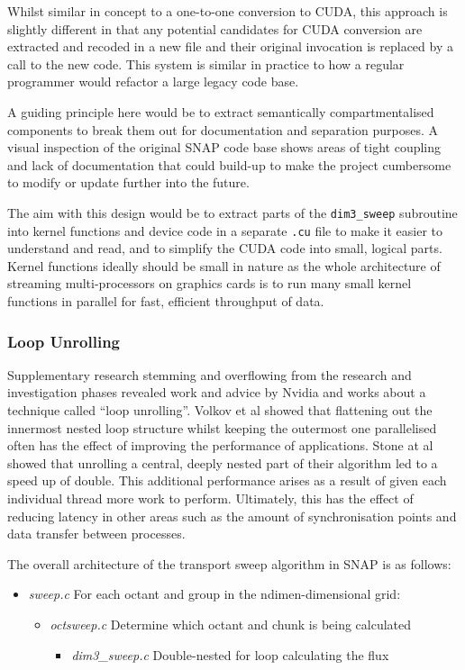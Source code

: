 \documentclass[conference]{IEEEtran}
\begin{document}
Whilst similar in concept to a one-to-one conversion to CUDA, this approach is slightly different in that any potential candidates for CUDA conversion are extracted and recoded in a new file and their original invocation is replaced by a call to the new code. This system is similar in practice to how a regular programmer would refactor a large legacy code base.

A guiding principle here would be to extract semantically compartmentalised components to break them out for documentation and separation purposes. A visual inspection of the original SNAP code base shows areas of tight coupling and lack of documentation that could build-up to make the project cumbersome to modify or update further into the future.

The aim with this design would be to extract parts of the \texttt{dim3\_sweep} subroutine into kernel functions and device code in a separate \texttt{.cu} file to make it easier to understand and read, and to simplify the CUDA code into small, logical parts. Kernel functions ideally should be small in nature as the whole architecture of streaming multi-processors on graphics cards is to run many small kernel functions in parallel for fast, efficient throughput of data.


\subsubsection{Loop Unrolling}

Supplementary research stemming and overflowing from the research and investigation phases revealed work and advice by Nvidia and works about a technique called ``loop unrolling''. Volkov et al\cite{volkov2011unrolling} showed that flattening out the innermost nested loop structure whilst keeping the outermost one parallelised often has the effect of improving the performance of applications. Stone at al\cite{stone2007accelerating} showed that unrolling a central, deeply nested part of their algorithm led to a speed up of double. This additional performance arises as a result of given each individual thread more work to perform. Ultimately, this has the effect of reducing latency in other areas such as the amount of synchronisation points and data transfer between processes.

The overall architecture of the transport sweep algorithm in SNAP is as follows:

\begin{itemize}
    \item \textit{sweep.c}
    For each octant and group in the ndimen-dimensional grid:
    \begin{itemize}
        \item \textit{octsweep.c}
        Determine which octant and chunk is being calculated
        \begin{itemize}
            \item \textit{dim3\_sweep.c}
            Double-nested for loop calculating the flux
        \end{itemize}
    \end{itemize}
\end{itemize}
\end{document}
